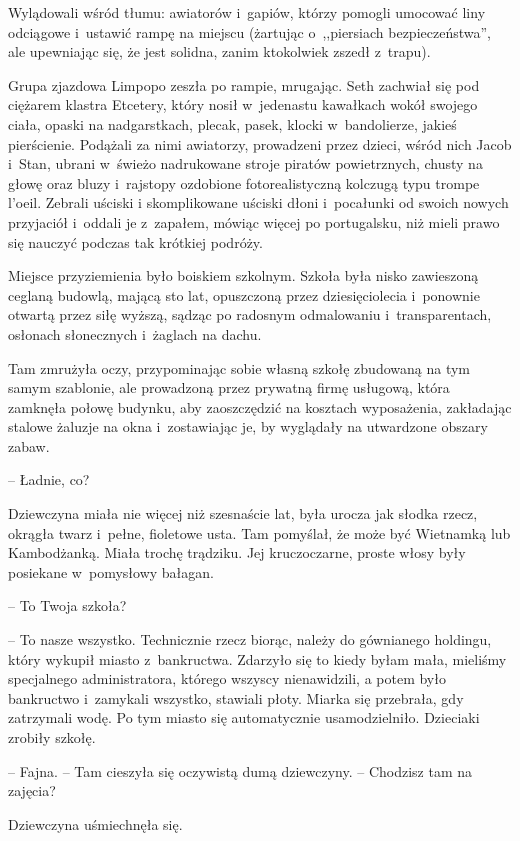 \documentclass[oneside,polish,11pt,sfheadings]{mwbk}
\begin{document}
Wylądowali wśród tłumu: awiatorów i~gapiów, którzy pomogli umocować liny
odciągowe i~ustawić rampę na miejscu (żartując o~,,piersiach
bezpieczeństwa'', ale upewniając się, że jest solidna, zanim ktokolwiek
zszedł z~trapu).

Grupa zjazdowa Limpopo zeszła po rampie, mrugając. Seth zachwiał się pod
ciężarem klastra Etcetery, który nosił w~jedenastu kawałkach wokół
swojego ciała, opaski na nadgarstkach, plecak, pasek, klocki w~bandolierze, jakieś pierścienie. Podążali za nimi awiatorzy, prowadzeni
przez dzieci, wśród nich Jacob i~Stan, ubrani w~świeżo nadrukowane
stroje piratów powietrznych, chusty na głowę oraz bluzy i~rajstopy
ozdobione fotorealistyczną kolczugą typu trompe l'oeil. Zebrali uściski
i skomplikowane uściski dłoni i~pocałunki od swoich nowych przyjaciół i~oddali je z~zapałem, mówiąc więcej po portugalsku, niż mieli prawo się
nauczyć podczas tak krótkiej podróży.

Miejsce przyziemienia było boiskiem szkolnym. Szkoła była nisko
zawieszoną ceglaną budowlą, mającą sto lat, opuszczoną przez
dziesięciolecia i~ponownie otwartą przez siłę wyższą, sądząc po radosnym
odmalowaniu i~transparentach, osłonach słonecznych i~żaglach na dachu.

Tam zmrużyła oczy, przypominając sobie własną szkołę zbudowaną na tym
samym szablonie, ale prowadzoną przez prywatną firmę usługową, która
zamknęła połowę budynku, aby zaoszczędzić na kosztach wyposażenia,
zakładając stalowe żaluzje na okna i~zostawiając je, by wyglądały na
utwardzone obszary zabaw.

-- Ładnie, co? 

Dziewczyna miała nie więcej niż szesnaście lat, była
urocza jak słodka rzecz, okrągła twarz i~pełne, fioletowe usta. Tam
pomyślał, że może być Wietnamką lub Kambodżanką. Miała trochę trądziku.
Jej kruczoczarne, proste włosy były posiekane w~pomysłowy bałagan.

-- To Twoja szkoła?

-- To nasze wszystko. Technicznie rzecz biorąc, należy do gównianego
holdingu, który wykupił miasto z~bankructwa. Zdarzyło się to kiedy byłam
mała, mieliśmy specjalnego administratora, którego wszyscy nienawidzili,
a potem było bankructwo i~zamykali wszystko, stawiali płoty. Miarka się
przebrała, gdy zatrzymali wodę. Po tym miasto się automatycznie
usamodzielniło. Dzieciaki zrobiły szkołę.

-- Fajna. -- Tam cieszyła się oczywistą dumą dziewczyny. -- Chodzisz tam na
zajęcia?

Dziewczyna uśmiechnęła się. 
\end{document}
